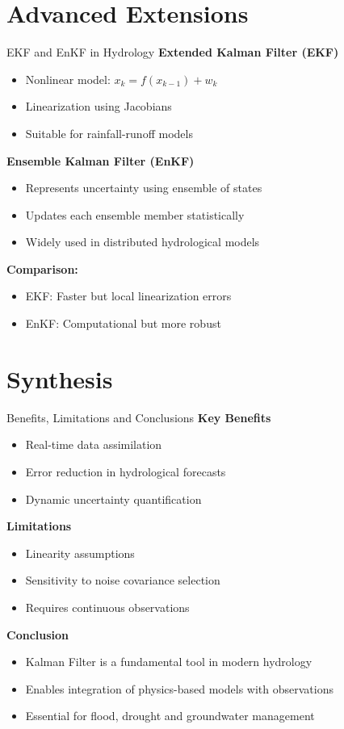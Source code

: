 \documentclass[8pt]{beamer}
\begin{document}
\section{Advanced Extensions}

\begin{frame}{EKF and EnKF in Hydrology}
\textbf{Extended Kalman Filter (EKF)}
\begin{itemize}
\item Nonlinear model: $x_k = f(x_{k-1}) + w_k$
\item Linearization using Jacobians
\item Suitable for rainfall-runoff models
\end{itemize}

\textbf{Ensemble Kalman Filter (EnKF)}
\begin{itemize}
\item Represents uncertainty using ensemble of states
\item Updates each ensemble member statistically
\item Widely used in distributed hydrological models
\end{itemize}

\textbf{Comparison:}
\begin{itemize}
\item EKF: Faster but local linearization errors
\item EnKF: Computational but more robust
\end{itemize}
\end{frame}

\section{Synthesis}

\begin{frame}{Benefits, Limitations and Conclusions}
\textbf{Key Benefits}
\begin{itemize}
\item Real-time data assimilation
\item Error reduction in hydrological forecasts
\item Dynamic uncertainty quantification
\end{itemize}

\textbf{Limitations}
\begin{itemize}
\item Linearity assumptions
\item Sensitivity to noise covariance selection
\item Requires continuous observations
\end{itemize}

\textbf{Conclusion}
\begin{itemize}
\item Kalman Filter is a fundamental tool in modern hydrology
\item Enables integration of physics-based models with observations
\item Essential for flood, drought and groundwater management
\end{itemize}
\end{frame}
\end{document}
